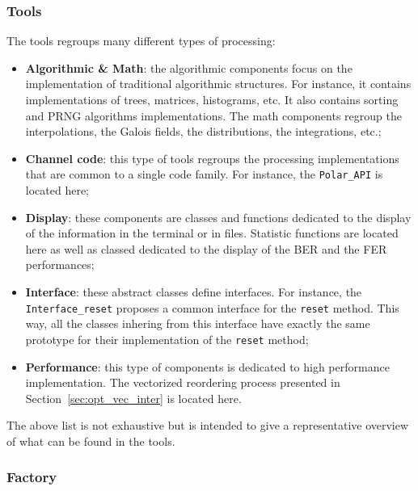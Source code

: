 \subsubsection{Tools}

The tools regroups many different types of processing:
\begin{itemize}
  \item \textbf{Algorithmic \& Math}: the algorithmic components focus on the
    implementation of traditional algorithmic structures. For instance, it
    contains implementations of trees, matrices, histograms, etc. It also
    contains sorting and PRNG algorithms implementations. The math components
    regroup the interpolations, the Galois fields, the distributions, the
    integrations, etc.;
  \item \textbf{Channel code}: this type of tools regroups the processing
    implementations that are common to a single code family. For instance, the
    \verb|Polar_API| is located here;
  \item \textbf{Display}: these components are classes and functions dedicated
    to the display of the information in the terminal or in files. Statistic
    functions are located here as well as classed dedicated to the display of
    the BER and the FER performances;
  \item \textbf{Interface}: these abstract classes define interfaces. For
    instance, the \verb|Interface_reset| proposes a common interface for the
    \verb|reset| method. This way, all the classes inhering from this interface
    have exactly the same prototype for their implementation of the \verb|reset|
    method;
  \item \textbf{Performance}: this type of components is dedicated to high
    performance implementation. The vectorized reordering process presented in
    Section~\ref{sec:opt_vec_inter} is located here.
\end{itemize}
The above list is not exhaustive but is intended to give a representative
overview of what can be found in the tools.

\subsubsection{Factory}

